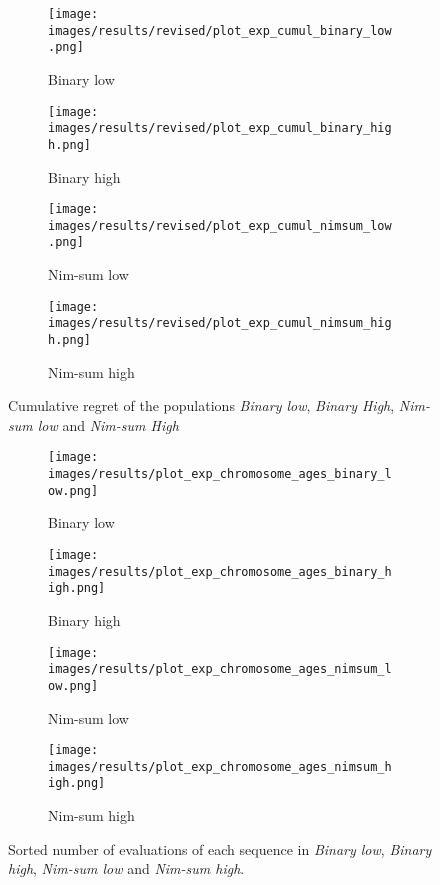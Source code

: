 \begin{figure}[ht]
	\begin{subfigure}{0.49\linewidth}
	\centering
	\texttt{[image: images/results/revised/plot\_exp\_cumul\_binary\_low.png]}
	\caption{Binary low}
	\label{fig:exp_cumul_binary_low}
	\end{subfigure}
	\hfill
	\begin{subfigure}{0.49\linewidth}
	\centering
	\texttt{[image: images/results/revised/plot\_exp\_cumul\_binary\_high.png]}
	\caption{Binary high}
	\label{fig:exp_cumul_binary_high}
	\end{subfigure}
	\begin{subfigure}{0.49\linewidth}
	\centering
	\texttt{[image: images/results/revised/plot\_exp\_cumul\_nimsum\_low.png]}
	\caption{Nim-sum low}
	\label{fig:exp_cumul_nimsum_low}
	\end{subfigure}
	\hfill
	\begin{subfigure}{0.49\linewidth}
	\centering
	\texttt{[image: images/results/revised/plot\_exp\_cumul\_nimsum\_high.png]}
	\caption{Nim-sum high}
	\label{fig:exp_cumul_nimsum_high}
	\end{subfigure}
	\caption[Cumulative regret in Binary and Nim-sum]{Cumulative regret of the populations \emph{Binary low},
	\emph{Binary High}, \emph{Nim-sum low} and \emph{Nim-sum High}}
	\label{fig:exp_cumul2}
\end{figure}

\begin{figure}[ht]
	\begin{subfigure}{0.49\linewidth}
	\centering
	\texttt{[image: images/results/plot\_exp\_chromosome\_ages\_binary\_low.png]}
	\caption{Binary low}
	\label{fig:exp_age_binary_low}
	\end{subfigure}
	\hfill
	\begin{subfigure}{0.49\linewidth}
	\centering
	\texttt{[image: images/results/plot\_exp\_chromosome\_ages\_binary\_high.png]}
	\caption{Binary high}
	\label{fig:exp_age_binary_high}
	\end{subfigure}
	\begin{subfigure}{0.49\linewidth}
	\centering
	\texttt{[image: images/results/plot\_exp\_chromosome\_ages\_nimsum\_low.png]}
	\caption{Nim-sum low}
	\label{fig:exp_age_nimsum_low}
	\end{subfigure}
	\hfill
	\begin{subfigure}{0.49\linewidth}
	\centering
	\texttt{[image: images/results/plot\_exp\_chromosome\_ages\_nimsum\_high.png]}
	\caption{Nim-sum high}
	\label{fig:exp_age_nimsum_high}
	\end{subfigure}
	\caption[Sorted number of evaluations in Binary and Nim-sum]{Sorted number of evaluations of each sequence in \emph{Binary
	low}, \emph{Binary high}, \emph{Nim-sum low} and \emph{Nim-sum high}.}
	\label{fig:exp_ages2}
\end{figure}

